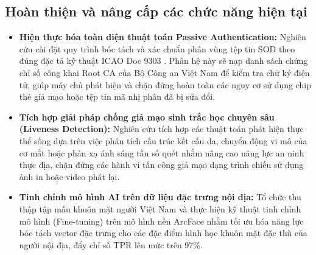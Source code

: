 \documentclass[../DoAn.tex]{subfiles}
\begin{document}
\subsection{Hoàn thiện và nâng cấp các chức năng hiện tại}
\begin{itemize}
    \item \textbf{Hiện thực hóa toàn diện thuật toán Passive Authentication:} Nghiên cứu cài đặt quy trình bóc tách và xác chuẩn phân vùng tệp tin SOD theo đúng đặc tả kỹ thuật ICAO Doc 9303 \cite{icao9303}. Phân hệ này sẽ nạp danh sách chứng chỉ số công khai Root CA của Bộ Công an Việt Nam để kiểm tra chữ ký điện tử, giúp máy chủ phát hiện và chặn đứng hoàn toàn các nguy cơ sử dụng chip thẻ giả mạo hoặc tệp tin mã nhị phân đã bị sửa đổi.
    \item \textbf{Tích hợp giải pháp chống giả mạo sinh trắc học chuyên sâu (Liveness Detection):} Nghiên cứu tích hợp các thuật toán phát hiện thực thể sống dựa trên việc phân tích cấu trúc kết cấu da, chuyển động vi mô của cơ mắt hoặc phản xạ ánh sáng tần số quét nhằm nâng cao năng lực an ninh thực địa, chặn đứng các hành vi tấn công giả mạo dạng trình chiếu sử dụng ảnh in hoặc video phát lại.
    \item \textbf{Tinh chỉnh mô hình AI trên dữ liệu đặc trưng nội địa:} Tổ chức thu thập tập mẫu khuôn mặt người Việt Nam và thực hiện kỹ thuật tinh chỉnh mô hình (Fine-tuning) trên mô hình nền ArcFace \cite{deng2019arcface} nhằm tối ưu hóa năng lực bóc tách vector đặc trưng cho các đặc điểm hình học khuôn mặt đặc thù của người nội địa, đẩy chỉ số TPR lên mức trên 97\%.
\end{itemize}
\end{document}

